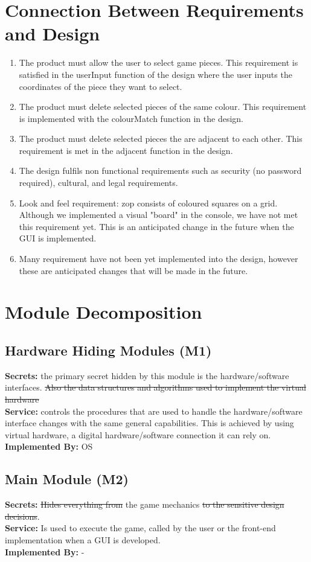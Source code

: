 \documentclass[12pt]{article}
\begin{document}
\section{Connection Between Requirements and Design}
\begin{enumerate}
 \item The product must allow the user to select game pieces.  This requirement is satisfied in the userInput function of the design where the user inputs the coordinates of the piece they want to select.
 \item The product must delete selected pieces of the same colour.  This requirement is implemented with the colourMatch function in the design.
 \item The product must delete selected pieces the are adjacent to each other.  This requirement is met in the adjacent function in the design.
 \item The design fulfils non functional requirements such as security (no password required), cultural, and legal requirements.
 \item Look and feel requirement: zop consists of coloured squares on a grid.  Although we implemented a visual "board" in the console, we have not met this requirement yet.  This is an anticipated change in the future when the GUI is implemented.
 \item Many requirement have not been yet implemented into the design, however these are anticipated changes that will be made in the future.
\end{enumerate}

\section{Module Decomposition}
\subsection{Hardware Hiding Modules (M1)}
\textbf{Secrets:} the primary secret hidden by this module is the hardware/software interfaces. \st{Also the data structures and algorithms used to implement the virtual hardware}\\
\textbf{Service:} controls the procedures that are used to handle the hardware/software interface changes with the same general capabilities. This is achieved by using virtual hardware, a digital hardware/software connection it can rely on. \\
\textbf{Implemented By:} OS

\subsection{Main Module (M2)}
\textbf{Secrets:} \st{Hides everything from} the game mechanics \st{to the sensitive design decisions}.\\
\textbf{Service:} Is used to execute the game, called by the user or the front-end implementation when a GUI is developed.\\
\textbf{Implemented By:} -
\end{document}
